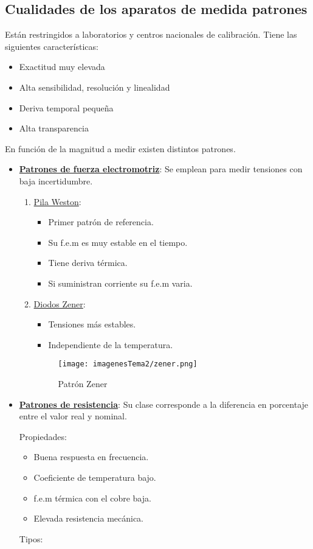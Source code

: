 \subsection{Cualidades de los aparatos de medida patrones}
Están restringidos a laboratorios y centros nacionales de calibración. Tiene las siguientes características:
\begin{itemize}
 \item Exactitud muy elevada
 \item Alta sensibilidad, resolución y linealidad
 \item Deriva temporal pequeña
 \item Alta transparencia	
\end{itemize}
\newpage
En función de la magnitud a medir existen distintos patrones.
\begin{itemize}
		\item \underline{\textbf{Patrones de fuerza electromotriz}}: Se emplean para medir tensiones con baja incertidumbre.
		\begin{enumerate}
			\item \underline{Pila Weston}:
			\begin{itemize}
				\item Primer patrón de referencia.
					\item Su f.e.m es muy estable en el tiempo.
						\item  Tiene deriva térmica.
						\item  Si suministran corriente su f.e.m varia.
			\end{itemize} 
			\item \underline{Diodos Zener}:
			\begin{itemize}
				\item Tensiones más estables.
				\item Independiente de la temperatura.
			\end{itemize} 
			
			\begin{figure}[H]
				\centering
				\texttt{[image: imagenesTema2/zener.png]}  
				\caption{Patrón Zener}
				\label{fig:sample}
			\end{figure}
	
		\end{enumerate}
	\item \underline{\textbf{Patrones de resistencia}}: Su clase corresponde a la diferencia en porcentaje entre el valor real y nominal.
	\begin{flushleft}
		Propiedades:
	\end{flushleft}
	\begin{itemize}
		\item Buena respuesta en frecuencia.
		\item Coeficiente de temperatura bajo.
		\item f.e.m térmica con el cobre baja.
		\item Elevada resistencia mecánica.
	\end{itemize}
	\begin{flushleft}
		Tipos:
	\end{flushleft}
	

\end{itemize}
